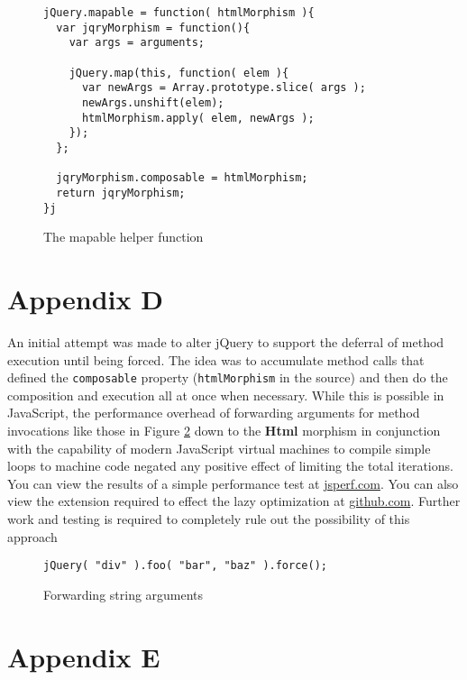 \documentclass[preprint, leqno]{sigplanconf}
\begin{document}
\begin{figure}[!ht]
\small
\begin{verbatim}
jQuery.mapable = function( htmlMorphism ){
  var jqryMorphism = function(){
    var args = arguments;

    jQuery.map(this, function( elem ){
      var newArgs = Array.prototype.slice( args );
      newArgs.unshift(elem);
      htmlMorphism.apply( elem, newArgs );
    });
  };

  jqryMorphism.composable = htmlMorphism;
  return jqryMorphism;
}j
\end{verbatim}
\nocaptionrule \caption{The mapable helper function}
\label{fig:mapable}
\end{figure}

\section{Appendix D}

An initial attempt was made to alter jQuery to support the deferral of method execution until being forced. The idea was to accumulate method calls that defined the \verb|composable| property (\verb|htmlMorphism| in the source) and then do the composition and execution all at once when necessary. While this is possible in JavaScript, the performance overhead of forwarding arguments for method invocations like those in Figure \ref{fig:args-juggle} down to the \textbf{Html} morphism in conjunction with the capability of modern JavaScript virtual machines to compile simple loops to machine code negated any positive effect of limiting the total iterations. You can view the results of a simple performance test at \href{http://jsperf.com/lazy-loop-fusion-vs-traditional-method-chaning/5}{jsperf.com}. You can also view the extension required to effect the lazy optimization at \href{https://github.com/johnbender/jquery-lazy-proxy/blob/79ab61e22547169d6f392512f782df2e29362ebc/lazy.js}{github.com}. Further work and testing is required to completely rule out the possibility of this approach

\begin{figure}[!ht]
\small
\begin{verbatim}
jQuery( "div" ).foo( "bar", "baz" ).force();
\end{verbatim}
\nocaptionrule \caption{Forwarding string arguments}
\label{fig:args-juggle}
\end{figure}

\section{Appendix E}
\end{document}
